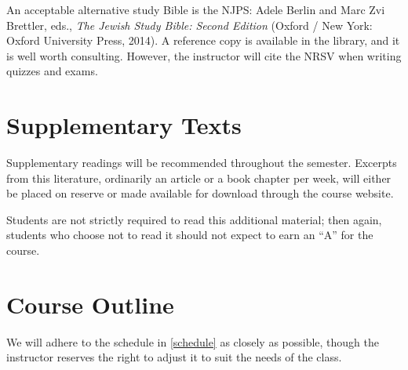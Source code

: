 \documentclass[titlepage]{article}
\begin{document}
An acceptable alternative study Bible is the NJPS: Adele Berlin and Marc
Zvi Brettler, eds., \emph{The Jewish Study Bible: Second Edition}
(Oxford / New York: Oxford University Press, 2014). A reference copy is
available in the library, and it is well worth consulting. However, the
instructor will cite the NRSV when writing quizzes and exams.

\section{Supplementary Texts}
\label{supplementary}

Supplementary readings will be recommended throughout the semester.
Excerpts from this literature, ordinarily an article or a book chapter
per week, will either be placed on reserve or made available for
download through the course website.

Students are not strictly required to read this additional material;
then again, students who choose not to read it should not expect to earn
an ``A'' for the course.

\section{Course Outline}
\label{outline}

We will adhere to the schedule in \autoref{schedule} as closely as
possible, though the instructor reserves the right to adjust it to suit
the needs of the class.

\newcommand\HBFB[1]{\cite[pp.~#1]{hbfb}}
\end{document}
